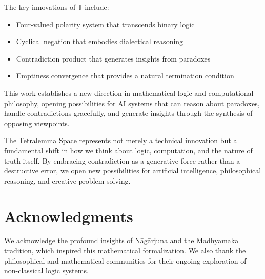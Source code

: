 \documentclass[11pt,a4paper]{article}
\begin{document}
The key innovations of $\mathbb{T}$ include:
\begin{itemize}
    \item Four-valued polarity system that transcends binary logic
    \item Cyclical negation that embodies dialectical reasoning
    \item Contradiction product that generates insights from paradoxes
    \item Emptiness convergence that provides a natural termination condition
\end{itemize}

This work establishes a new direction in mathematical logic and computational philosophy, opening possibilities for AI systems that can reason about paradoxes, handle contradictions gracefully, and generate insights through the synthesis of opposing viewpoints.

The Tetralemma Space represents not merely a technical innovation but a fundamental shift in how we think about logic, computation, and the nature of truth itself. By embracing contradiction as a generative force rather than a destructive error, we open new possibilities for artificial intelligence, philosophical reasoning, and creative problem-solving.

\section*{Acknowledgments}

We acknowledge the profound insights of Nāgārjuna and the Madhyamaka tradition, which inspired this mathematical formalization. We also thank the philosophical and mathematical communities for their ongoing exploration of non-classical logic systems.
\end{document}
